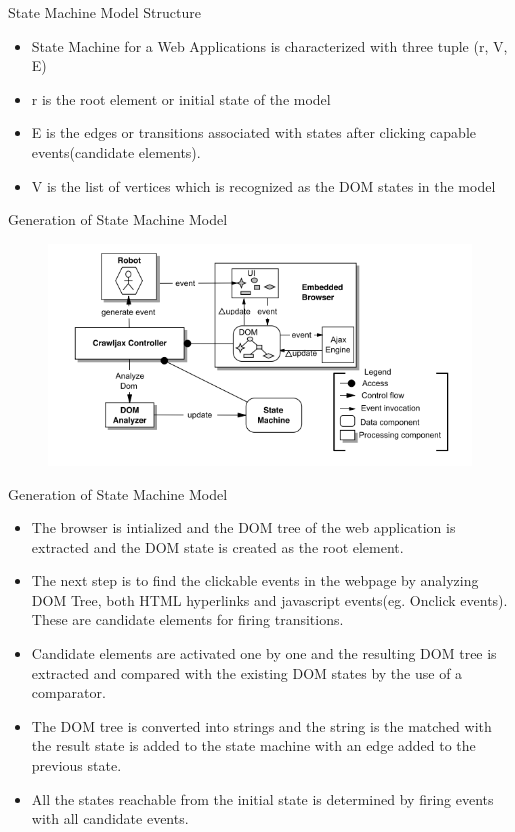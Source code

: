 \documentclass{beamer}
\begin{document}
\begin{frame}{State Machine Model Structure}
 \begin{itemize}

     \item State Machine for a Web Applications is characterized with three tuple (r, V, E) 
     \item r is the root element or initial state of the model
     \item E is the edges or transitions associated with states after clicking capable events(candidate elements).     
     \item V is the list of vertices which is recognized as the DOM states in the model
 \end{itemize}
 \end{frame}
 
 
\begin{frame}{Generation of State Machine Model}
 \begin{figure}[h]
    \centering
    \includegraphics[scale=0.6]{MTP2.png}
\end{figure}
\end{frame}

 
\begin{frame}{Generation of State Machine Model}
\begin{itemize}
    \item The browser is intialized and the DOM tree of the web application is extracted and the DOM state is created as the root element.
    \item The next step is to find the clickable events in the webpage by analyzing DOM Tree, both HTML hyperlinks and javascript events(eg. Onclick events). These are candidate elements for firing transitions.
    \item Candidate elements are activated one by one and the resulting DOM tree is extracted and compared with the existing DOM states by the use of a comparator. 
    \item The DOM tree is converted into strings and the string is the matched with the result state is added to the state machine with an edge added to the previous state. 
    \item All the states reachable from the initial state is determined by firing events with all candidate events.
\end{itemize}
\end{frame}
\end{document}
